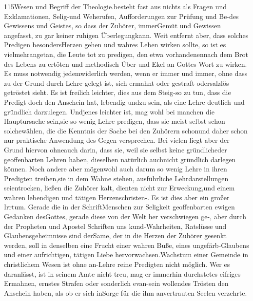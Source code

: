 115\qquad Wesen und Begriff der Theologie.\n\nPredigt besteht fast aus nichts als Fragen und Exklamationen, Selig-\npreisungen und Weherufen, Aufforderungen zur Prüfung und Be-\narbeitungen des Gewissens und Geistes, so dass der Zuhörer, immer\nim Gemüt und Gewissen angefasst, zu gar keiner ruhigen Überlegung\nkommen kann. Weit entfernt aber, dass solches Predigen besonders\nzu Herzen gehen und wahres Leben wirken sollte, so ist es vielmehr\ndazu angetan, die Leute tot zu predigen, den etwa vorhandenen\nHunger nach dem Brot des Lebens zu ertöten und methodisch Über- und Ekel an Gottes Wort zu wirken. Es muss notwendig jedem widerlich werden, wenn er immer und immer, ohne dass zu-\nvor der Grund durch Lehre gelegt ist, sich ermahnt oder gestraft oder\nauch salzlös getröstet sieht. Es ist freilich leichter, dies aus dem Steig-\nreif so zu tun, dass die Predigt doch den Anschein hat, lebendig und zu sein, als eine Lehre deutlich und gründlich darzulegen. Und\ndass jenes leichter ist, mag wohl bei manchen die Hauptursache sein,\ndass sie so wenig Lehre predigen, dass sie meist selbst schon solche\nThemata wählen, die die Kenntnis der Sache bei den Zuhörern schon\nvoraussetzen und daher schon nur praktische Anwendung des Gegen-\nstandes versprechen. Bei vielen liegt aber der Grund hiervon ohne\nZweifel auch darin, dass sie, weil sie selbst keine gründliche\nKenntnis der geoffenbarten Lehren haben, dieselben natürlich auch\nandern nicht gründlich darlegen können. Noch andere aber mögen\nendlich wohl auch darum so wenig Lehre in ihren Predigten treiben,\nweil sie in dem Wahne stehen, ausführliche Lehrdarstellungen seien\nzu trocken, ließen die Zuhörer kalt, dienten nicht zur Erweckung,\nBekehrung und einem wahren lebendigen und tätigen Herzenschristen-\ntum. Es ist dies aber ein großer Irrtum. Gerade die in der Schrift\nuns Menschen zur Seligkeit geoffenbarten ewigen Gedanken des\nHerzens Gottes, gerade diese von der Welt her verschwiegen ge-\nwesen, aber durch der Propheten und Apostel Schriften uns kund-\ngemachten Wahrheiten, Ratslüsse und Glaubensgeheimnisse sind der\nhimmlische Same, der in die Herzen der Zuhörer gesenkt werden\nmuss, soll in denselben eine Frucht einer wahren Buße, eines ungefärb-\nten Glaubens und einer aufrichtigen, tätigen Liebe hervorwachsen.\nWahres Wachstum einer Gemeinde in christlichem Wesen ist ohne an- Lehre reine Predigten nicht möglich. Wer es daran\nfehlen lässt, ist in seinem Amte nicht treu, mag er immerhin durch\nsein stetes eifriges Ermahnen, ernstes Strafen oder sonderlich evan-\ngelisch sein wollendes Trösten den Anschein haben, als ob er sich in\ntreuer Sorge für die ihm anvertrauten Seelen verzehrte.